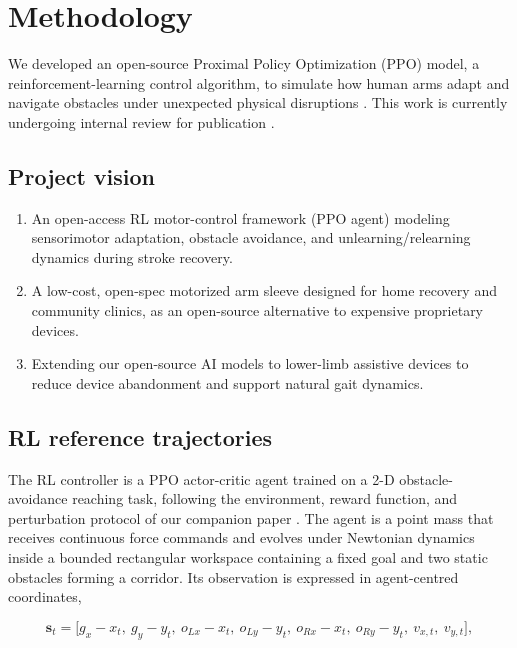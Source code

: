 \documentclass[11pt]{article}
\begin{document}
\section{Methodology}

We developed an open-source Proximal Policy Optimization (PPO) model, a reinforcement-learning control algorithm, to simulate how human arms adapt and navigate obstacles under unexpected physical disruptions \citep{Schulman2017}. This work is currently undergoing internal review for publication \citep{Ohue2026}.

\subsection*{Project vision}

\begin{enumerate}
  \item An open-access RL motor-control framework (PPO agent) modeling sensorimotor adaptation, obstacle avoidance, and unlearning/relearning dynamics during stroke recovery.
  \item A low-cost, open-spec motorized arm sleeve designed for home recovery and community clinics, as an open-source alternative to expensive proprietary devices.
  \item Extending our open-source AI models to lower-limb assistive devices to reduce device abandonment and support natural gait dynamics.
\end{enumerate}

\subsection{RL reference trajectories}

The RL controller is a PPO actor-critic agent trained on a 2-D obstacle-avoidance reaching task, following the environment, reward function, and perturbation protocol of our companion paper \citep{Ohue2026}. The agent is a point mass that receives continuous force commands and evolves under Newtonian dynamics inside a bounded rectangular workspace containing a fixed goal and two static obstacles forming a corridor. Its observation is expressed in agent-centred coordinates,

\begin{equation}
\mathbf{s}_t = \big[g_x - x_t,\ g_y - y_t,\ o_{Lx} - x_t,\ o_{Ly} - y_t,\ o_{Rx} - x_t,\ o_{Ry} - y_t,\ v_{x,t},\ v_{y,t}\big],
\label{eq:state}
\end{equation}
\end{document}
